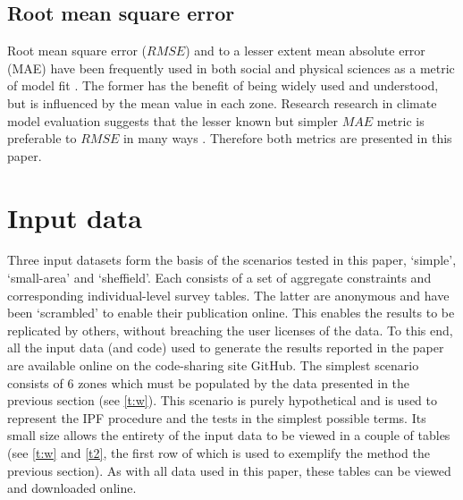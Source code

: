 \documentclass[a4paper,10pt]{article}
\begin{document}


\subsection{Root mean square error}
Root mean square error ($RMSE$) and to a lesser extent mean absolute error (MAE)
have been frequently
used in both social and physical sciences as a metric of model fit
\citep{Legates1999GOF,Ngo2012}. %
The former has the benefit of being widely used and understood, but is
influenced by the mean value in each zone. Research research in climate model
evaluation suggests that the lesser known but simpler $MAE$ metric is preferable
to $RMSE$ in many ways \citep{Willmott2005}. Therefore both metrics are presented
in this paper.

\section{Input data}
Three input datasets form the basis of the scenarios tested in this paper,
`simple', `small-area' and `sheffield'. Each consists of a set of aggregate
constraints and corresponding individual-level survey tables.
The latter are anonymous and have been `scrambled' to enable their
publication online. This enables the results to be replicated by others,
without breaching the user licenses of the data.
To this end, all the input data (and code) used to generate the results reported
in the paper are available online on the code-sharing site GitHub.
The simplest scenario consists of 6 zones which must be populated by the
data presented in the previous section (see \cref{t:w}).
This scenario is purely hypothetical and is used to represent the IPF procedure
and the tests in the simplest possible terms. Its small size allows the entirety
of the input data to be viewed in a couple of tables 
(see \cref{t:w} and \cref{t2}, the first row of which is used
to exemplify the method the previous section). As with all
data used in this paper, these tables can be
viewed and downloaded online.
\end{document}
